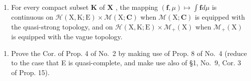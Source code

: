 \begin{enumerate}
\def\labelenumi{\alph{enumi})}
\setcounter{enumi}{1}
\tightlist
\item
  For every compact subset \(\mathbf{K}\) of \(\mathbf{X}\) , the mapping \((\mathbf{f},\mu)\mapsto \int \mathbf{f}d\mu\) is continuous on \(\mathcal{H}(\mathrm{X},\mathrm{K};\mathrm{E})\times \mathcal{M}(\mathrm{X};\mathbf{C})\) when \(\mathcal{M}(\mathrm{X};\mathbf{C})\) is equipped with the quasi-strong topology, and on \(\mathcal{H}(\mathrm{X},\mathrm{K};\mathrm{E})\times \mathcal{M}_{+}(\mathrm{X})\) when \(\mathcal{M}_{+}(\mathrm{X})\) is equipped with the vague topology.
\end{enumerate}

\begin{enumerate}
\def\labelenumi{\arabic{enumi})}
\setcounter{enumi}{3}
\tightlist
\item
  Prove the Cor. of Prop. 4 of No.~2 by making use of Prop. 8 of No.~4 (reduce to the case that E is quasi-complete, and make use also of §1, No.~9, Cor. 3 of Prop. 15).
\end{enumerate}

\setcounter{exercisegroup}{4}
\edef\CurrentExerciseGroup{\arabic{exercisegroup}}
